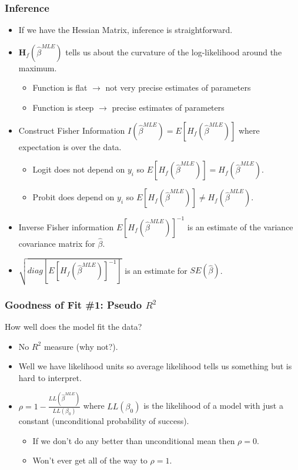 \documentclass[aspectratio=169]{beamer}
\begin{document}
\begin{frame}
\frametitle{Inference}
\begin{itemize} 
\item If we have the Hessian Matrix, inference is straightforward.
\item $\mathbf{H}_f(\hat{\beta}^{MLE})$ tells us about the \alert{curvature} of the log-likelihood around the maximum.
\begin{itemize}
\item Function is flat $\rightarrow$ not very precise estimates of parameters
\item Function is steep $\rightarrow$  precise estimates of parameters
\end{itemize}
\item Construct \alert{Fisher Information} $I(\hat{\beta}^{MLE}) = E[H_f(\hat{\beta}^{MLE})]$ where expectation is over the data.
\begin{itemize}
\item Logit does not depend on $y_i$ so $E[H_f(\hat{\beta}^{MLE})]=H_f(\hat{\beta}^{MLE})$.
\item Probit does depend on $y_i$ so $E[H_f(\hat{\beta}^{MLE})]\neq H_f(\hat{\beta}^{MLE})$.
\end{itemize}
\item Inverse Fisher information $E[H_f(\hat{\beta}^{MLE})]^{-1}$ is an estimate of the variance covariance matrix for $\hat{\beta}$.
\item $\sqrt{diag[E[H_f(\hat{\beta}^{MLE})]^{-1}]}$ is an estimate for $SE(\hat{\beta})$.
\end{itemize}
\end{frame}

\begin{frame}
\frametitle{Goodness of Fit \#1: Pseudo $R^2$}
How well does the model fit the data?
\begin{itemize} 
\item No $R^2$ measure (why not?).
\item Well we have likelihood units so average likelihood tells us something but is hard to interpret.
\item $\rho = 1- \frac{LL(\hat{\beta}^{MLE})}{LL(\beta_0)}$ where $LL(\beta_0)$ is the likelihood of a model with just a constant (unconditional probability of success).
\begin{itemize}
\item If we don't do any better than unconditional mean then $\rho=0$.
\item Won't ever get all of the way to $\rho =1$.
\end{itemize}
\end{itemize}
\end{frame}
\end{document}
